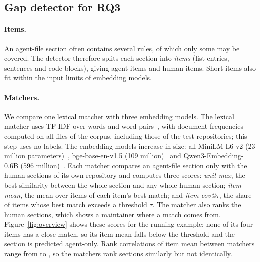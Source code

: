 \documentclass[sigconf,nonacm]{acmart}
\begin{document}
\subsection{Gap detector for RQ3}\label{sec:detector}

\paragraph{Items.} An agent-file section often contains several rules, of which only some may be
covered. The detector therefore splits each section into \emph{items} (list entries, sentences and
code blocks), giving \nItemsAgent{} agent items and \nItemsHuman{} human items. Short items also fit
within the input limits of embedding models.

\paragraph{Matchers.} We compare one lexical matcher with three embedding models. The lexical
matcher uses TF-IDF over words and word pairs~\cite{salton1988termweighting}, with document
frequencies computed on all files of the corpus, including those of the test repositories; this step
uses no labels. The embedding models increase in size: all-MiniLM-L6-v2 (23 million
parameters)~\cite{reimers2019sbert}, bge-base-en-v1.5 (109 million)~\cite{xiao2023cpack} and
Qwen3-Embedding-0.6B (596 million)~\cite{zhang2025qwen3embedding}. Each matcher compares an
agent-file section only with the human sections of its own repository and computes three scores:
\emph{unit max}, the best similarity between the whole section and any whole human section;
\emph{item mean}, the mean over items of each item's best match; and \emph{item cov@$\tau$}, the
share of items whose best match exceeds a threshold $\tau$. The matcher also ranks the human
sections, which shows a maintainer where a match comes from. Figure~\ref{fig:overview} shows these
scores for the running example: none of its four items has a close match, so its item mean falls
below the threshold and the section is predicted agent-only. Rank correlations of item mean between
matchers range from \matcherRhoMin{} to \matcherRhoMax, so the matchers rank sections similarly but
not identically.
\end{document}
